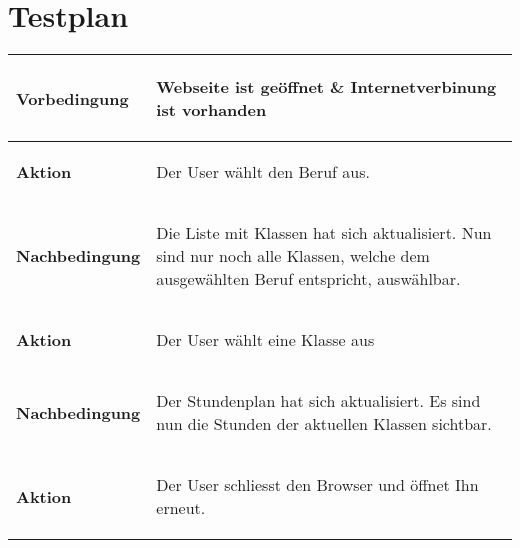 \documentclass[11pt,a4paper,titlepage,portrait,ngerman,final]{scrartcl}
\begin{document}
\section{Testplan}
\vspace{2.5mm}
\noindent
\begin{tabular}{|p{}||p{}|}
\hline \rule[-2ex]{0pt}{5.5ex} \textbf{Vorbedingung} & {
	\begin{list}{\textendash}{\vspace{-5mm}}
		\item{Webseite ist geöffnet \& Internetverbinung ist vorhanden}
	\end{list}
} \\ 
\hline \rule[-2ex]{0pt}{5.5ex} \textbf{Aktion} & {
	\begin{list}{\textendash}{\vspace{-5mm}}
		\item{Der User wählt den Beruf aus.}
	\end{list}
} \\ 
\hline \rule[-2ex]{0pt}{5.5ex} \textbf{Nachbedingung} & {
	\begin{list}{\textendash}{\vspace{-5mm}}
		\item{Die Liste mit Klassen hat sich aktualisiert. Nun sind nur noch alle Klassen, welche dem ausgewählten Beruf entspricht, auswählbar.}
	\end{list}
}  \\
\hline \rule[-2ex]{0pt}{5.5ex} \textbf{Aktion} & {
	\begin{list}{\textendash}{\vspace{-5mm}}
		\item{Der User wählt eine Klasse aus}
	\end{list}
} \\ 
\hline \rule[-2ex]{0pt}{5.5ex} \textbf{Nachbedingung} & {
	\begin{list}{\textendash}{\vspace{-5mm}}
		\item{Der Stundenplan hat sich aktualisiert. Es sind nun die Stunden der aktuellen Klassen sichtbar.}
	\end{list}
}  \\
\hline \rule[-2ex]{0pt}{5.5ex} \textbf{Aktion} & {
	\begin{list}{\textendash}{\vspace{-5mm}}
		\item{Der User schliesst den Browser und öffnet Ihn erneut.}
	\end{list}
}
\end{tabular}
\end{document}
